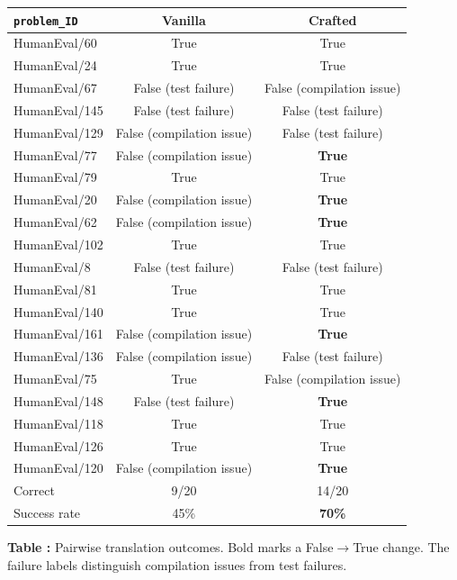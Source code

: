 \documentclass[sigconf,nonacm]{acmart}
\begin{document}
\begin{center}
\begin{minipage}{\columnwidth}\centering
\scriptsize
\setlength{\tabcolsep}{2pt}
\begin{tabular}{@{}lcc@{}}
\toprule
\texttt{problem\_ID} & Vanilla & Crafted \\
\midrule
HumanEval/60  & True                      & True                      \\
HumanEval/24  & True                      & True                      \\
HumanEval/67  & False (test failure)      & False (compilation issue) \\
HumanEval/145 & False (test failure)      & False (test failure)      \\
HumanEval/129 & False (compilation issue) & False (test failure)      \\
HumanEval/77  & False (compilation issue) & \textbf{True}             \\
HumanEval/79  & True                      & True                      \\
HumanEval/20  & False (compilation issue) & \textbf{True}             \\
HumanEval/62  & False (compilation issue) & \textbf{True}             \\
HumanEval/102 & True                      & True                      \\
HumanEval/8   & False (test failure)      & False (test failure)      \\
HumanEval/81  & True                      & True                      \\
HumanEval/140 & True                      & True                      \\
HumanEval/161 & False (compilation issue) & \textbf{True}             \\
HumanEval/136 & False (compilation issue) & False (test failure)      \\
HumanEval/75  & True                      & False (compilation issue) \\
HumanEval/148 & False (test failure)      & \textbf{True}             \\
HumanEval/118 & True                      & True                      \\
HumanEval/126 & True                      & True                      \\
HumanEval/120 & False (compilation issue) & \textbf{True}             \\
\midrule
Correct       & 9/20                      & 14/20                     \\
Success rate  & 45\%                      & \textbf{70\%}             \\
\bottomrule
\end{tabular}
\par\smallskip
{}\label{tab:mp3t1pairwise}\textbf{Table \thetable:}
Pairwise translation outcomes. Bold marks a False$\rightarrow$True change.
The failure labels distinguish compilation issues from test failures.
\end{minipage}
\end{center}
\end{document}
